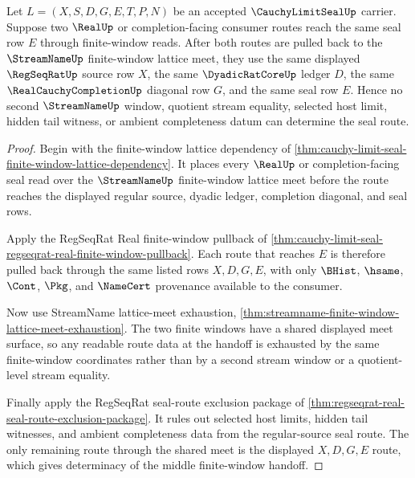 \begin{theorem}
\label{thm:cauchy-limit-seal-middle-window-meet-determinacy}
Let $L=(X,S,D,G,E,T,P,N)$ be an accepted $\CauchyLimitSealUp$ carrier. Suppose two $\RealUp$ or completion-facing consumer routes reach the same seal row $E$ through finite-window reads. After both routes are pulled back to the $\StreamNameUp$ finite-window lattice meet, they use the same displayed $\RegSeqRatUp$ source row $X$, the same $\DyadicRatCoreUp$ ledger $D$, the same $\RealCauchyCompletionUp$ diagonal row $G$, and the same seal row $E$. Hence no second $\StreamNameUp$ window, quotient stream equality, selected host limit, hidden tail witness, or ambient completeness datum can determine the seal route.
\end{theorem}
\begin{proof}
Begin with the finite-window lattice dependency of \autoref{thm:cauchy-limit-seal-finite-window-lattice-dependency}. It places every $\RealUp$ or completion-facing seal read over the $\StreamNameUp$ finite-window lattice meet before the route reaches the displayed regular source, dyadic ledger, completion diagonal, and seal rows.

Apply the RegSeqRat Real finite-window pullback of \autoref{thm:cauchy-limit-seal-regseqrat-real-finite-window-pullback}. Each route that reaches $E$ is therefore pulled back through the same listed rows $X,D,G,E$, with only $\BHist$, $\hsame$, $\Cont$, $\Pkg$, and $\NameCert$ provenance available to the consumer.

Now use StreamName lattice-meet exhaustion, \autoref{thm:streamname-finite-window-lattice-meet-exhaustion}. The two finite windows have a shared displayed meet surface, so any readable route data at the handoff is exhausted by the same finite-window coordinates rather than by a second stream window or a quotient-level stream equality.

Finally apply the RegSeqRat seal-route exclusion package of \autoref{thm:regseqrat-real-seal-route-exclusion-package}. It rules out selected host limits, hidden tail witnesses, and ambient completeness data from the regular-source seal route. The only remaining route through the shared meet is the displayed $X,D,G,E$ route, which gives determinacy of the middle finite-window handoff.
\end{proof}

